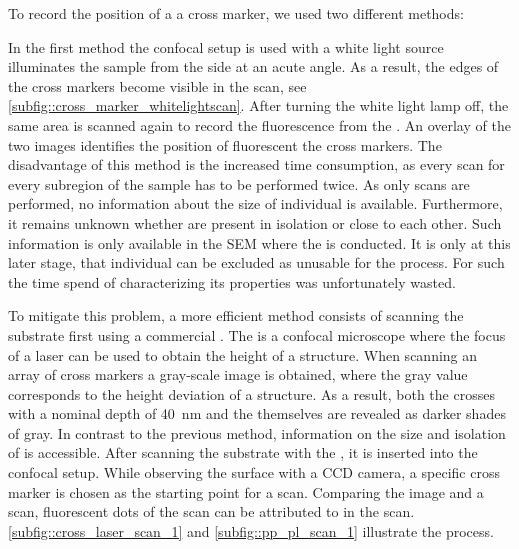 		To record the position of a \nd \wrt a cross marker, we used two different methods:

		In the first method the confocal setup is used with a white light source illuminates the sample from the side at an acute angle. As a result, the edges of the cross markers become visible in the \fl scan, see \autoref{subfig::cross_marker_whitelightscan}. After turning the white light lamp off, the same area is scanned again to record the fluorescence from the \sivs. An overlay of the two images identifies the position of fluorescent \sivs \wrt the cross markers. The disadvantage of this method is the increased time consumption, as every scan for every subregion of the sample has to be performed twice. As only \fl scans are performed, no information about the size of individual \nds is available. Furthermore, it remains unknown whether \nds are present in isolation or close to each other. Such information is only available in the SEM where the \pp is conducted. It is only at this later stage, that individual \nds can be excluded as unusable for the \pp process. For such \nds the time spend of characterizing its properties was unfortunately wasted.

		To mitigate this problem, a more efficient method consists of scanning the substrate first using a commercial \lsm. The \lsm is a confocal microscope where the focus of a laser can be used to obtain the height of a structure. When scanning an array of cross markers a gray-scale image is obtained, where the gray value corresponds to the height deviation of a structure. As a result, both the crosses with a nominal depth of \SI{40}{\nm} and the \nds themselves are revealed as darker shades of gray. In contrast to the previous method, information on the size and isolation of \nds is accessible. After scanning the substrate with the \lsm, it is inserted into the confocal setup. While observing the surface with a CCD camera, a specific cross marker is chosen as the starting point for a \fl scan. Comparing the \lsm image and a \fl scan, fluorescent dots of the \fl scan can be attributed to \nds in the \lsm scan. \autoref{subfig::cross_laser_scan_1} and \autoref{subfig::pp_pl_scan_1} illustrate the process.

